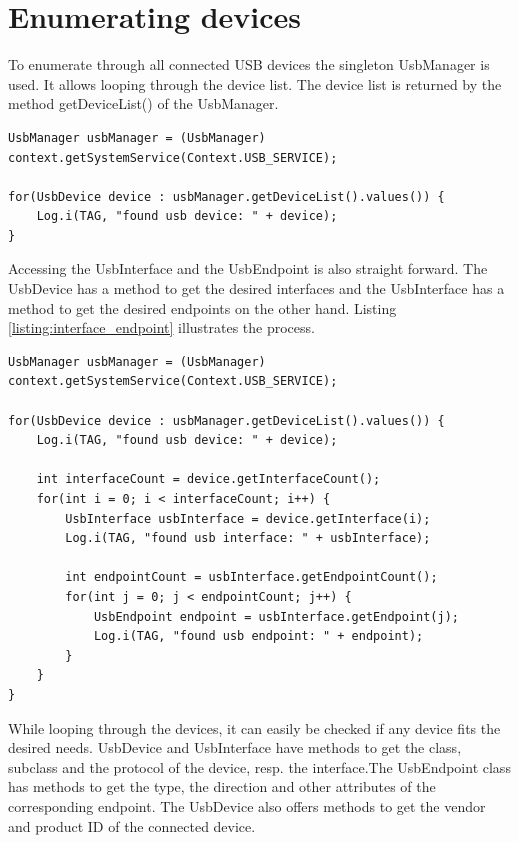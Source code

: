 \section{Enumerating devices}

To enumerate through all connected USB devices the singleton UsbManager is used. It allows looping through the device list. The device list is returned by the method getDeviceList() of the UsbManager.

\begin{lstlisting}[caption=Enumerating connected USB devices, label=listing:enumerate]
UsbManager usbManager = (UsbManager) context.getSystemService(Context.USB_SERVICE);
		
for(UsbDevice device : usbManager.getDeviceList().values()) {
	Log.i(TAG, "found usb device: " + device);
}
\end{lstlisting}

Accessing the UsbInterface and the UsbEndpoint is also straight forward. The UsbDevice has a method to get the desired interfaces and the UsbInterface has a method to get the desired endpoints on the other hand. Listing \ref{listing:interface_endpoint} illustrates the process.

\begin{lstlisting}[caption=Accessing UsbInterface and UsbEndpoint, label=listing:interface_endpoint]
UsbManager usbManager = (UsbManager) context.getSystemService(Context.USB_SERVICE);
		
for(UsbDevice device : usbManager.getDeviceList().values()) {
	Log.i(TAG, "found usb device: " + device);
	
	int interfaceCount = device.getInterfaceCount();
	for(int i = 0; i < interfaceCount; i++) {
		UsbInterface usbInterface = device.getInterface(i);
		Log.i(TAG, "found usb interface: " + usbInterface);
		
		int endpointCount = usbInterface.getEndpointCount();
		for(int j = 0; j < endpointCount; j++) {
			UsbEndpoint endpoint = usbInterface.getEndpoint(j);
			Log.i(TAG, "found usb endpoint: " + endpoint);
		}
	}
}
\end{lstlisting}

While looping through the devices, it can easily be checked if any device fits the desired needs. UsbDevice and UsbInterface have methods to get the class, subclass and the protocol of the device, resp. the interface.The UsbEndpoint class has methods to get the type, the direction and other attributes of the corresponding endpoint. The UsbDevice also offers methods to get the vendor and product ID of the connected device.

